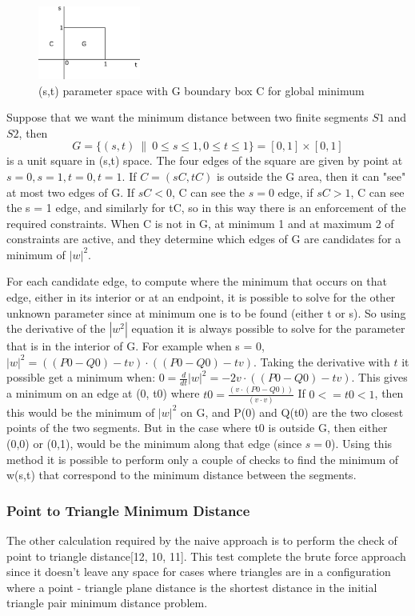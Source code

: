 \begin{figure}[!h]
\centering
\includegraphics[width=0.3\textwidth]{sketches/ss_box} \protect\caption{\label{fig9}(s,t) parameter space with G boundary box C for global minimum}
\end{figure} 

Suppose that we want the minimum distance between two finite segments $S1$ and $S2$, then 
$$G=\{ (s,t) \: \| \: 0 \leq s \leq 1, 0 \leq t \leq 1 \} = [0,1]\times[0,1]$$ 
is a unit square in (s,t) space. The four edges of the square are given by point at $s = 0, s = 1, t = 0, t = 1$. If $C = (sC, tC)$ is outside the G area, then it can "see" at most two edges of G. If $sC < 0$, C can see the $s = 0$ edge, if $sC > 1$, C can see the s = 1 edge, and similarly for tC, so in this way there is an enforcement of the required constraints. When C is not in G, at minimum 1 and at maximum 2 of constraints are active, and they determine which edges of G are candidates for a minimum of $|w| ^2$.
 
For each candidate edge, to compute where the minimum that occurs on that edge, either in its interior or at an endpoint, it is possible to solve for the other unknown parameter since at minimum one is to be found (either t or s). So using the derivative of the $|w^2|$ equation it is always possible to solve for the parameter that is in the interior of G. For example when s = 0, $|w|^2 = ((P0-Q0)-tv) \cdot ((P0-Q0)-tv)$. Taking the derivative with $t$ it possible get a minimum when: $0 = \frac{d}{dt}|w|^2 = -2v \cdot ((P0-Q0)-tv)$.
This gives a minimum on an edge at (0, t0) where $t0 = \frac{(v \cdot (P0-Q0))}{(v \cdot v)}$
If $0 <= t0 < 1$, then this would be the minimum of $|w|^2$ on G, and P(0) and Q(t0) are the two closest points of the two segments. But in the case where t0 is outside G, then either (0,0) or (0,1), would be the minimum along that edge (since $s=0$). Using this method it is possible to perform only a couple of checks to find the minimum of w(s,t) that correspond to the minimum distance between the segments.

\subsubsection{Point to Triangle Minimum Distance}
The other calculation required by the naive approach is to perform the check of point to triangle distance[12, 10, 11]. This test complete the brute force approach since it doesn't leave any  space for cases where triangles are in a configuration where a point - triangle plane distance is the shortest distance in the initial triangle pair minimum distance problem. 

